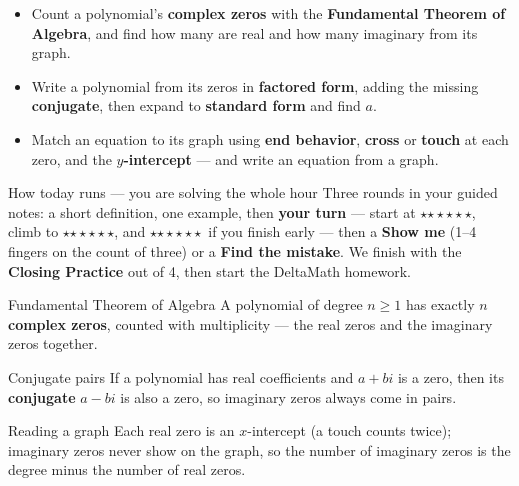 \documentclass[aspectratio=169, 11pt]{beamer}
\newcommand{\rung}[1]{{\color{goldacc}\ifcase#1\or$\star$\or$\star\star$\or$\star\star\star$\fi}}
\begin{document}
\begin{frame}[t, plain]
  \begin{itemize}\setlength{\itemsep}{3pt}
    \item Count a polynomial's \textbf{complex zeros} with the \textbf{Fundamental Theorem of
          Algebra}, and find how many are real and how many imaginary from its graph.
    \item Write a polynomial from its zeros in \textbf{factored form}, adding the missing
          \textbf{conjugate}, then expand to \textbf{standard form} and find $a$.
    \item Match an equation to its graph using \textbf{end behavior}, \textbf{cross} or
          \textbf{touch} at each zero, and the \textbf{$y$-intercept} --- and write an
          equation from a graph.
  \end{itemize}
  \vspace{2pt}
  \begin{block}{How today runs --- you are solving the whole hour}
    Three rounds in your guided notes: a short definition, one example, then \textbf{your turn}
    --- start at \rung1, climb to \rung2, and \rung3\ if you finish early --- then a \textbf{Show
    me} (1--4 fingers on the count of three) or a \textbf{Find the mistake}. We finish with the
    \textbf{Closing Practice} out of 4, then start the DeltaMath homework.
  \end{block}
\end{frame}

\begin{frame}[t, plain]
  \begin{block}{Fundamental Theorem of Algebra}
    A polynomial of degree $n\ge1$ has exactly $n$ \textbf{complex zeros}, counted with
    multiplicity --- the real zeros and the imaginary zeros together.
  \end{block}
  \vspace{2pt}
  \begin{block}{Conjugate pairs}
    If a polynomial has real coefficients and $a+bi$ is a zero, then its \textbf{conjugate}
    $a-bi$ is also a zero, so imaginary zeros always come in pairs.
  \end{block}
  \vspace{2pt}
  \begin{block}{Reading a graph}
    Each real zero is an $x$-intercept (a touch counts twice); imaginary zeros never show on
    the graph, so the number of imaginary zeros is the degree minus the number of real zeros.
  \end{block}
\end{frame}
\end{document}
